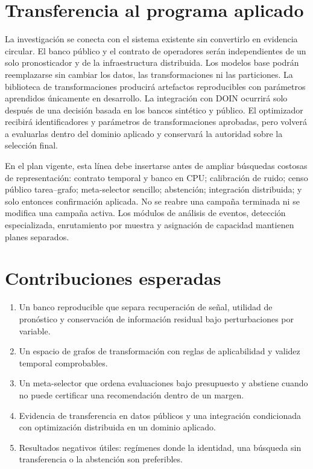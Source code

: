 \documentclass[11pt,letterpaper]{article}
\begin{document}
\section{Transferencia al programa aplicado}

La investigación se conecta con el sistema existente sin convertirlo en evidencia circular.
El banco público y el contrato de operadores serán independientes de un solo pronosticador y de la infraestructura distribuida.
Los modelos base podrán reemplazarse sin cambiar los datos, las transformaciones ni las particiones.
La biblioteca de transformaciones producirá artefactos reproducibles con parámetros aprendidos únicamente en desarrollo.
La integración con DOIN ocurrirá solo después de una decisión basada en los bancos sintético y público.
El optimizador recibirá identificadores y parámetros de transformaciones aprobadas, pero volverá a evaluarlas dentro del dominio aplicado y conservará la autoridad sobre la selección final.

En el plan vigente, esta línea debe insertarse antes de ampliar búsquedas costosas de representación:
contrato temporal y banco en CPU; calibración de ruido; censo público tarea--grafo; meta-selector sencillo; abstención; integración distribuida; y solo entonces confirmación aplicada.
No se reabre una campaña terminada ni se modifica una campaña activa.
Los módulos de análisis de eventos, detección especializada, enrutamiento por muestra y asignación de capacidad mantienen planes separados.

\section{Contribuciones esperadas}

\begin{enumerate}
  \item Un banco reproducible que separa recuperación de señal, utilidad de pronóstico y conservación de información residual bajo perturbaciones por variable.
  \item Un espacio de grafos de transformación con reglas de aplicabilidad y validez temporal comprobables.
  \item Un meta-selector que ordena evaluaciones bajo presupuesto y abstiene cuando no puede certificar una recomendación dentro de un margen.
  \item Evidencia de transferencia en datos públicos y una integración condicionada con optimización distribuida en un dominio aplicado.
  \item Resultados negativos útiles: regímenes donde la identidad, una búsqueda sin transferencia o la abstención son preferibles.
\end{enumerate}
\end{document}
